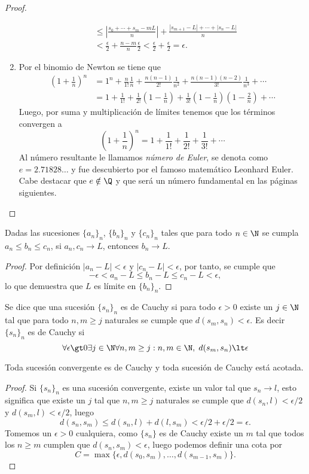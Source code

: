 \documentclass[11pt,oneside,a4paper]{book}
\begin{document}
\begin{proof}
\begin{enumerate}[$a$)]
\begin{align*}
&\leq\left|\frac{s_0+\cdots+s_m-mL}{n}\right|+\frac{|s_{m+1}-L|+\cdots+|s_n-L|}{n}\\
&\lt\frac{\epsilon}{2}+\frac{n-m}{n}\frac{\epsilon}{2}\lt\frac{\epsilon}{2}+\frac{\epsilon}{2}=\epsilon.
\end{align*}
\item Por el binomio de Newton se tiene que
\begin{align*}
\left(1+\frac{1}{n}\right)^n&=1^n+\frac{n}{1!}\frac{1}{n}+\frac{n(n-1)}{2!}\frac{1}{n^2}+\frac{n(n-1)(n-2)}{3!}\frac{1}{n^3}+\cdots\\
&=1+\frac{1}{1!}+\frac{1}{2!}\left(1-\frac{1}{n}\right)+\frac{1}{3!}\left(1-\frac{1}{n}\right)\left(1-\frac{2}{n}\right)+\cdots
\end{align*}
Luego, por suma y multiplicación de límites tenemos que los términos convergen a
$$\left(1+\frac{1}{n}\right)^n=1+\frac{1}{1!}+\frac{1}{2!}+\frac{1}{3!}+\cdots$$
Al número resultante le llamamos \textit{número de Euler}, se denota como $e=2.71828\dots$ y fue descubierto por el famoso matemático Leonhard Euler. Cabe destacar que $e\notin\Q$ y que será un número fundamental en las páginas siguientes.
\end{enumerate}
\end{proof}
\begin{thm}
Dadas las sucesiones $\{a_n\}_n$, $\{b_n\}_n$ y $\{c_n\}_n$ tales que para todo $n\in\N$ se cumpla $a_n\leq b_n\leq c_n$, si $a_n,c_n\to L$, entonces $b_n\to L$.
\end{thm}
\begin{proof}
Por definición $|a_n-L|\lt\epsilon$ y $|c_n-L|\lt\epsilon$, por tanto, se cumple que
$$-\epsilon\lt a_n-L\leq b_n-L\leq c_n-L\lt\epsilon,$$
lo que demuestra que $L$ es límite en $\{b_n\}_n$.
\end{proof}
\begin{mydef}
Se dice que una sucesión $\{s_n\}_n$ es de Cauchy si para todo $\epsilon\gt 0$ existe un $j\in\N$ tal que para todo $n,m\geq j$ naturales se cumple que $d(s_m,s_n)\lt\epsilon$. Es decir $\{s_n\}_n$ es de Cauchy si
$$\forall\epsilon\gt 0\exists j\in\N\forall n,m\geq j:n,m\in\N,\;d(s_m,s_n)\lt\epsilon$$
\end{mydef}
\begin{thm}
Toda sucesión convergente es de Cauchy y toda sucesión de Cauchy está acotada.
\end{thm}
\begin{proof}
Si $\{s_n\}_n$ es una sucesión convergente, existe un valor tal que $s_n\to l$, esto significa que existe un $j$ tal que $n,m\geq j$ naturales se cumple que $d(s_n,l)\lt\epsilon/2$ y $d(s_m,l)\lt\epsilon/2$, luego
$$d(s_n,s_m)\leq d(s_n,l)+d(l,s_m)\lt\epsilon/2+\epsilon/2=\epsilon.$$
Tomemos un $\epsilon\gt 0$ cualquiera, como $\{s_n\}$ es de Cauchy existe un $m$ tal que todos los $n\geq m$ cumplen que $d(s_n,s_m)\lt\epsilon$, luego podemos definir una cota por
$$C=\max\{\epsilon,d(s_0,s_m),\dots,d(s_{m-1},s_m)\}.$$
\end{proof}
\end{document}
